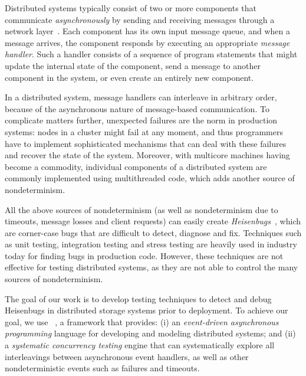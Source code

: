 Distributed systems typically consist of two or more components that communicate \emph{asynchronously} by sending and receiving messages through a network layer~\cite{lamport1978time}. Each component has its own input message queue, and when a message arrives, the component responds by executing an appropriate \emph{message handler}. Such a handler consists of a sequence of program statements that might update the internal state of the component, send a message to another component in the system, or even create an entirely new component.

In a distributed system, message handlers can interleave in arbitrary order, because of the asynchronous nature of message-based communication. To complicate matters further, unexpected failures are the norm in production systems: nodes in a cluster might fail at any moment, and thus programmers have to implement sophisticated mechanisms that can deal with these failures and recover the state of the system. Moreover, with multicore machines having become a commodity, individual components of a distributed system are commonly implemented using multithreaded code, which adds another source of nondeterminism.

All the above sources of nondeterminism (as well as nondeterminism due to timeouts, message losses and client requests) can easily create \emph{Heisenbugs}~\cite{gray1986computers, musuvathi2008finding}, which are corner-case bugs that are difficult to detect, diagnose and fix. Techniques such as unit testing, integration testing and stress testing are heavily used in industry today for finding bugs in production code. However, these techniques are not effective for testing distributed systems, as they are not able to control the many sources of nondeterminism.

The goal of our work is to develop testing techniques to detect and debug Heisenbugs in distributed storage systems prior to deployment.
To achieve our goal, we use \psharp~\cite{deligiannis2015psharp}, a framework that provides: (i) an \emph{event-driven asynchronous programming} language for developing and modeling distributed systems; and (ii) a \emph{systematic concurrency testing} engine that can systematically explore all interleavings between asynchronous event handlers, as well as other nondeterministic events such as failures and timeouts.

